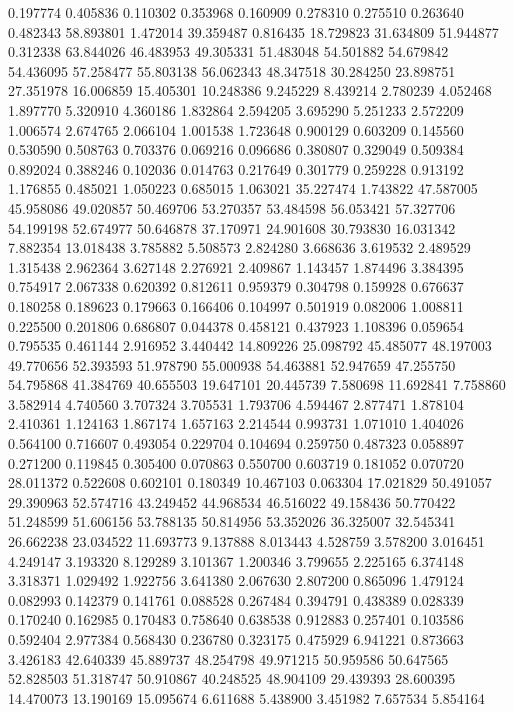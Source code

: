 0.197774
0.405836
0.110302
0.353968
0.160909
0.278310
0.275510
0.263640
0.482343
58.893801
1.472014
39.359487
0.816435
18.729823
31.634809
51.944877
0.312338
63.844026
46.483953
49.305331
51.483048
54.501882
54.679842
54.436095
57.258477
55.803138
56.062343
48.347518
30.284250
23.898751
27.351978
16.006859
15.405301
10.248386
9.245229
8.439214
2.780239
4.052468
1.897770
5.320910
4.360186
1.832864
2.594205
3.695290
5.251233
2.572209
1.006574
2.674765
2.066104
1.001538
1.723648
0.900129
0.603209
0.145560
0.530590
0.508763
0.703376
0.069216
0.096686
0.380807
0.329049
0.509384
0.892024
0.388246
0.102036
0.014763
0.217649
0.301779
0.259228
0.913192
1.176855
0.485021
1.050223
0.685015
1.063021
35.227474
1.743822
47.587005
45.958086
49.020857
50.469706
53.270357
53.484598
56.053421
57.327706
54.199198
52.674977
50.646878
37.170971
24.901608
30.793830
16.031342
7.882354
13.018438
3.785882
5.508573
2.824280
3.668636
3.619532
2.489529
1.315438
2.962364
3.627148
2.276921
2.409867
1.143457
1.874496
3.384395
0.754917
2.067338
0.620392
0.812611
0.959379
0.304798
0.159928
0.676637
0.180258
0.189623
0.179663
0.166406
0.104997
0.501919
0.082006
1.008811
0.225500
0.201806
0.686807
0.044378
0.458121
0.437923
1.108396
0.059654
0.795535
0.461144
2.916952
3.440442
14.809226
25.098792
45.485077
48.197003
49.770656
52.393593
51.978790
55.000938
54.463881
52.947659
47.255750
54.795868
41.384769
40.655503
19.647101
20.445739
7.580698
11.692841
7.758860
3.582914
4.740560
3.707324
3.705531
1.793706
4.594467
2.877471
1.878104
2.410361
1.124163
1.867174
1.657163
2.214544
0.993731
1.071010
1.404026
0.564100
0.716607
0.493054
0.229704
0.104694
0.259750
0.487323
0.058897
0.271200
0.119845
0.305400
0.070863
0.550700
0.603719
0.181052
0.070720
28.011372
0.522608
0.602101
0.180349
10.467103
0.063304
17.021829
50.491057
29.390963
52.574716
43.249452
44.968534
46.516022
49.158436
50.770422
51.248599
51.606156
53.788135
50.814956
53.352026
36.325007
32.545341
26.662238
23.034522
11.693773
9.137888
8.013443
4.528759
3.578200
3.016451
4.249147
3.193320
8.129289
3.101367
1.200346
3.799655
2.225165
6.374148
3.318371
1.029492
1.922756
3.641380
2.067630
2.807200
0.865096
1.479124
0.082993
0.142379
0.141761
0.088528
0.267484
0.394791
0.438389
0.028339
0.170240
0.162985
0.170483
0.758640
0.638538
0.912883
0.257401
0.103586
0.592404
2.977384
0.568430
0.236780
0.323175
0.475929
6.941221
0.873663
3.426183
42.640339
45.889737
48.254798
49.971215
50.959586
50.647565
52.828503
51.318747
50.910867
40.248525
48.904109
29.439393
28.600395
14.470073
13.190169
15.095674
6.611688
5.438900
3.451982
7.657534
5.854164
